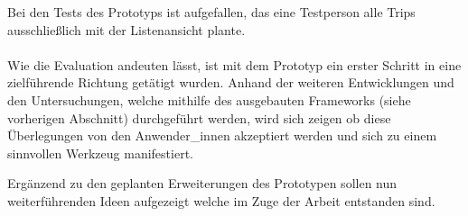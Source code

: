 \documentclass[Bachelorarbeit.tex]{subfiles}
\begin{document}
Bei den Tests des Prototyps ist aufgefallen, das eine Testperson alle Trips ausschließlich mit der Listenansicht plante. \\
\\
Wie die Evaluation andeuten lässt, ist mit dem Prototyp ein erster Schritt in eine zielführende Richtung getätigt wurden.
Anhand der weiteren Entwicklungen und den Untersuchungen, welche mithilfe des ausgebauten Frameworks (siehe vorherigen Abschnitt) durchgeführt werden, wird sich zeigen ob diese Überlegungen von den Anwender\_innen akzeptiert werden und sich zu einem sinnvollen Werkzeug manifestiert.








Ergänzend zu den geplanten Erweiterungen des Prototypen sollen nun weiterführenden Ideen aufgezeigt welche im Zuge der Arbeit entstanden sind.
\end{document}
